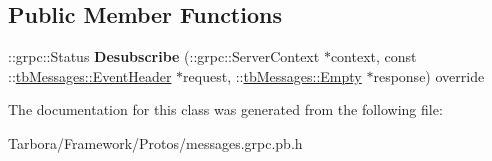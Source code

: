 \subsection*{Public Member Functions}
\begin{DoxyCompactItemize}
\item 
\mbox{\label{classtbMessages_1_1TarboraMessages_1_1WithGenericMethod__Desubscribe_a3c598c58b2d466eb10bafded4a18815c}} 
\+::grpc\+::\+Status {\bfseries Desubscribe} (\+::grpc\+::\+Server\+Context $\ast$context, const \+::\hyperlink{classtbMessages_1_1EventHeader}{tb\+Messages\+::\+Event\+Header} $\ast$request, \+::\hyperlink{classtbMessages_1_1Empty}{tb\+Messages\+::\+Empty} $\ast$response) override
\end{DoxyCompactItemize}


The documentation for this class was generated from the following file\+:\begin{DoxyCompactItemize}
\item 
Tarbora/\+Framework/\+Protos/messages.\+grpc.\+pb.\+h\end{DoxyCompactItemize}
